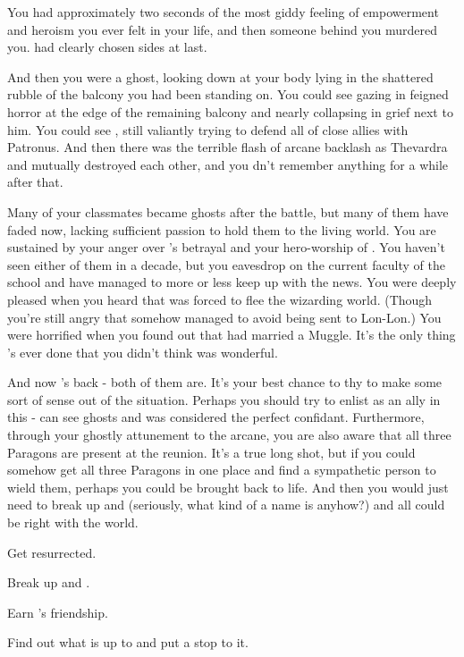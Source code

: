 \documentclass[char]{Katmeers}
\begin{document}
You had approximately two seconds of the most giddy feeling of empowerment and heroism you ever felt in your life, and then someone behind you murdered you. \cMalfoy{\formal} had clearly chosen sides at last.

And then you were a ghost, looking down at your body lying in the shattered rubble of the balcony you had been standing on. You could see \cMalfoy{\formal} gazing in feigned horror at the edge of the remaining balcony and \cGoyle{\formal} nearly collapsing in grief next to him. You could see \cHermione{}, still valiantly trying to defend all of \cHermione{\their} close allies with  Patronus. And then there was the terrible flash of arcane backlash as Thevardra and \cHarry{} mutually destroyed each other, and you dn't remember anything for a while after that.

Many of your classmates became ghosts after the battle, but many of them have faded now, lacking sufficient passion to hold them to the living world. You are sustained by your anger over \cMalfoy{\formal}'s betrayal and your hero-worship of \cHermione{}. You haven't seen either of them in a decade, but you eavesdrop on the current faculty of the school and have managed to more or less keep up with the news. You were deeply pleased when you heard that \cMalfoy{\formal} was forced to flee the wizarding world. (Though you're still angry that \cMalfoy{\they} somehow managed to avoid being sent to Lon-Lon.) You were horrified when you found out that \cHermione{} had married a Muggle. It's the only thing \cHermione{\they}'s ever done that you didn't think was wonderful.

And now \cHermione{\they}'s back - both of them are. It's your best chance to thy to make some sort of sense out of the situation. Perhaps you should try to enlist \cCrabbe{} as an ally in this - \cCrabbe{\they} can see ghosts and \cCrabbe{\they} was considered the perfect confidant. Furthermore, through your ghostly attunement to the arcane, you are also aware that all three Paragons are present at the reunion. It's a true long shot, but if you could somehow get all three Paragons in one place and find a sympathetic person to wield them, perhaps you could be brought back to life. And then you would just need to break up \cHermione{} and \cHarry{\MYname} (seriously, what kind of a name is \cHarry{\MYname} anyhow?) and all could be right with the world.

\begin{itemz}[Goals]
	\item Get resurrected.
	\item Break up \cHermione{} and \cHarry{\MYname}.
	\item Earn \cHermione{}'s friendship.
	\item Find out what \cMalfoy{\formal} is up to and put a stop to it.
\end{itemz}
\end{document}
